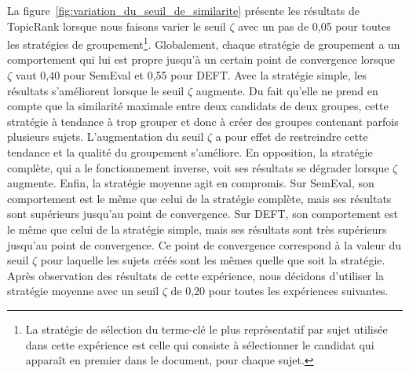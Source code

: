    La figure~\ref{fig:variation_du_seuil_de_similarite} présente les résultats
    de TopicRank lorsque nous faisons varier le seuil $\zeta$ avec un pas de
    0,05 pour toutes les stratégies de groupement\footnote{La stratégie de
    sélection du terme-clé le plus représentatif par sujet utilisée dans cette
    expérience est celle qui consiste à sélectionner le candidat qui apparaît en
    premier dans le document, pour chaque sujet.}.
    Globalement, chaque stratégie de groupement a un comportement qui lui est
    propre jusqu'à un certain point de convergence lorsque $\zeta$ vaut 0,40
    pour SemEval et 0,55 pour DEFT. Avec la stratégie simple, les résultats
    s'améliorent lorsque le seuil $\zeta$ augmente. Du fait qu'elle ne prend en
    compte que la similarité maximale entre deux candidats de deux groupes,
    cette stratégie à tendance à trop grouper et donc à créer des groupes
    contenant parfois plusieurs sujets. L'augmentation du seuil $\zeta$ a pour
    effet de restreindre cette tendance et la qualité du groupement s'améliore.
    En opposition, la stratégie complète, qui a le fonctionnement inverse, voit
    ses résultats se dégrader lorsque $\zeta$ augmente. Enfin, la stratégie
    moyenne agit en compromis. Sur SemEval, son comportement est le même que
    celui de la stratégie complète, mais ses résultats sont supérieurs jusqu'au
    point de convergence. Sur DEFT, son comportement est le même que celui de la
    stratégie simple, mais ses résultats sont très supérieurs jusqu'au point de
    convergence. Ce point de convergence correspond à la valeur du seuil $\zeta$
    pour laquelle les sujets créés sont les mêmes quelle que soit la stratégie.
    Après observation des résultats de cette expérience, nous décidons
    d'utiliser la stratégie moyenne avec un seuil $\zeta$ de 0,20 pour toutes
    les expériences suivantes.

